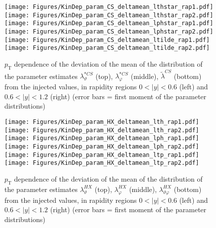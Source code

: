 \documentclass[12pt]{article}
\newcommand{\pT}{p_\mathrm{T}}
\newcommand{\absy}{\left |  y \right |}
\newcommand{\lamtildeCS}{\tilde{\lambda}^{\scriptscriptstyle CS}}
\newcommand{\lamthstarCS}{\lambda^{* \scriptscriptstyle CS}_\vartheta}
\newcommand{\lamphstarCS}{\lambda^{* \scriptscriptstyle CS}_\varphi}
\newcommand{\lamthHX}{\lambda^{\scriptscriptstyle HX}_\vartheta}
\newcommand{\lamphHX}{\lambda^{\scriptscriptstyle HX}_\varphi}
\newcommand{\lamthphHX}{\lambda^{\scriptscriptstyle HX}_{\vartheta \varphi}}
\begin{document}
\begin{figure}[htbp]
\centering
\texttt{[image: Figures/KinDep\_param\_CS\_deltamean\_lthstar\_rap1.pdf]}
\texttt{[image: Figures/KinDep\_param\_CS\_deltamean\_lthstar\_rap2.pdf]}
\texttt{[image: Figures/KinDep\_param\_CS\_deltamean\_lphstar\_rap1.pdf]}
\texttt{[image: Figures/KinDep\_param\_CS\_deltamean\_lphstar\_rap2.pdf]}
\texttt{[image: Figures/KinDep\_param\_CS\_deltamean\_ltilde\_rap1.pdf]}
\texttt{[image: Figures/KinDep\_param\_CS\_deltamean\_ltilde\_rap2.pdf]}
\caption{$\pT$ dependence of the deviation of the mean of the distribution of
the parameter estimates $\lamthstarCS$ (top), $\lamphstarCS$ (middle),
$\lamtildeCS$ (bottom) from the injected values, in rapidity regions
$0<\absy<0.6$ (left) and $0.6<\absy<1.2$ (right) (error bars = first moment of
the parameter distributions)}
\end{figure}
\clearpage









\begin{figure}[htbp]
\centering
\texttt{[image: Figures/KinDep\_param\_HX\_deltamean\_lth\_rap1.pdf]}
\texttt{[image: Figures/KinDep\_param\_HX\_deltamean\_lth\_rap2.pdf]}
\texttt{[image: Figures/KinDep\_param\_HX\_deltamean\_lph\_rap1.pdf]}
\texttt{[image: Figures/KinDep\_param\_HX\_deltamean\_lph\_rap2.pdf]}
\texttt{[image: Figures/KinDep\_param\_HX\_deltamean\_ltp\_rap1.pdf]}
\texttt{[image: Figures/KinDep\_param\_HX\_deltamean\_ltp\_rap2.pdf]}
\caption{$\pT$ dependence of the deviation of the mean of the distribution of
the parameter estimates $\lamthHX$ (top), $\lamphHX$ (middle), $\lamthphHX$
(bottom) from the injected values, in rapidity regions $0<\absy<0.6$ (left) and
$0.6<\absy<1.2$ (right) (error bars = first moment of the parameter
distributions)}
\end{figure}
\clearpage
\end{document}
